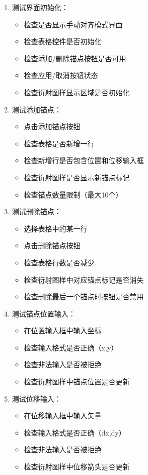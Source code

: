 \documentclass[a4paper,12pt]{report}	%
\begin{document}
\begin{enumerate}
    \item 测试界面初始化：
    \begin{itemize}
        \item 检查是否显示手动对齐模式界面
        \item 检查表格控件是否初始化
        \item 检查添加/删除锚点按钮是否可用
        \item 检查应用/取消按钮状态
        \item 检查衍射图样显示区域是否初始化
    \end{itemize}

    \item 测试添加锚点：
    \begin{itemize}
        \item 点击添加锚点按钮
        \item 检查表格是否新增一行
        \item 检查新增行是否包含位置和位移输入框
        \item 检查衍射图样是否显示新锚点标记
        \item 检查锚点数量限制（最大10个）
    \end{itemize}

    \item 测试删除锚点：
    \begin{itemize}
        \item 选择表格中的某一行
        \item 点击删除锚点按钮
        \item 检查表格行数是否减少
        \item 检查衍射图样中对应锚点标记是否消失
        \item 检查删除最后一个锚点时按钮是否禁用
    \end{itemize}

    \item 测试锚点位置输入：
    \begin{itemize}
        \item 在位置输入框中输入坐标
        \item 检查输入格式是否正确（x,y）
        \item 检查非法输入是否被拒绝
        \item 检查衍射图样中锚点位置是否更新
    \end{itemize}

    \item 测试位移输入：
    \begin{itemize}
        \item 在位移输入框中输入矢量
        \item 检查输入格式是否正确（dx,dy）
        \item 检查非法输入是否被拒绝
        \item 检查衍射图样中位移箭头是否更新
    \end{itemize}


\end{enumerate}
\end{document}
